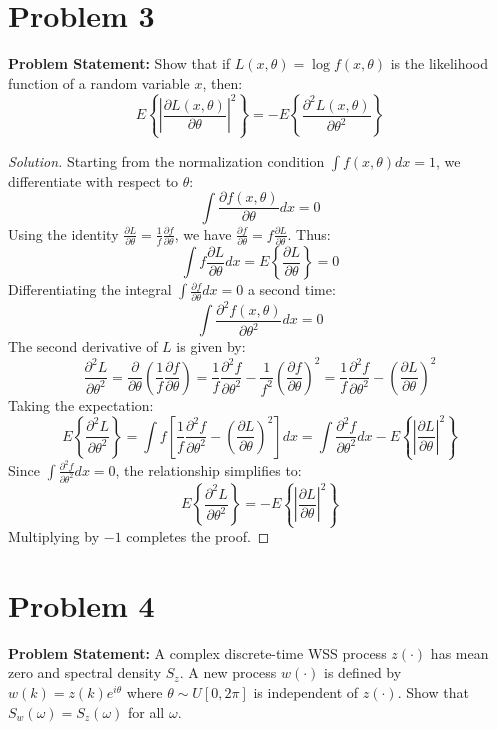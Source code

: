 \documentclass{article}
\begin{document}
\section*{Problem 3}
\textbf{Problem Statement:}
Show that if $L(x, \theta) = \log f(x, \theta)$ is the likelihood function of a random variable $x$, then:
\[ E \left\{ \left| \frac{\partial L(x, \theta)}{\partial \theta} \right|^2 \right\} = -E \left\{ \frac{\partial^2 L(x, \theta)}{\partial \theta^2} \right\} \]

\begin{proof}[Solution]
	Starting from the normalization condition $\int f(x, \theta) dx = 1$, we differentiate with respect to $\theta$:
	\[ \int \frac{\partial f(x, \theta)}{\partial \theta} dx = 0 \]
	Using the identity $\frac{\partial L}{\partial \theta} = \frac{1}{f} \frac{\partial f}{\partial \theta}$, we have $\frac{\partial f}{\partial \theta} = f \frac{\partial L}{\partial \theta}$. Thus:
	\[ \int f \frac{\partial L}{\partial \theta} dx = E \left\{ \frac{\partial L}{\partial \theta} \right\} = 0 \]
	Differentiating the integral $\int \frac{\partial f}{\partial \theta} dx = 0$ a second time:
	\[ \int \frac{\partial^2 f(x, \theta)}{\partial \theta^2} dx = 0 \]
	The second derivative of $L$ is given by:
	\[ \frac{\partial^2 L}{\partial \theta^2} = \frac{\partial}{\partial \theta} \left( \frac{1}{f} \frac{\partial f}{\partial \theta} \right) = \frac{1}{f} \frac{\partial^2 f}{\partial \theta^2} - \frac{1}{f^2} \left( \frac{\partial f}{\partial \theta} \right)^2 = \frac{1}{f} \frac{\partial^2 f}{\partial \theta^2} - \left( \frac{\partial L}{\partial \theta} \right)^2 \]
	Taking the expectation:
	\[ E \left\{ \frac{\partial^2 L}{\partial \theta^2} \right\} = \int f \left[ \frac{1}{f} \frac{\partial^2 f}{\partial \theta^2} - \left( \frac{\partial L}{\partial \theta} \right)^2 \right] dx = \int \frac{\partial^2 f}{\partial \theta^2} dx - E \left\{ \left| \frac{\partial L}{\partial \theta} \right|^2 \right\} \]
	Since $\int \frac{\partial^2 f}{\partial \theta^2} dx = 0$, the relationship simplifies to:
	\[ E \left\{ \frac{\partial^2 L}{\partial \theta^2} \right\} = -E \left\{ \left| \frac{\partial L}{\partial \theta} \right|^2 \right\} \]
	Multiplying by $-1$ completes the proof.
\end{proof}


\section*{Problem 4}
\textbf{Problem Statement:}
A complex discrete-time WSS process $z(\cdot)$ has mean zero and spectral density $S_z$. A new process $w(\cdot)$ is defined by $w(k) = z(k)e^{i\theta}$ where $\theta \sim U[0, 2\pi]$ is independent of $z(\cdot)$. Show that $S_w(\omega) = S_z(\omega)$ for all $\omega$.
\end{document}
